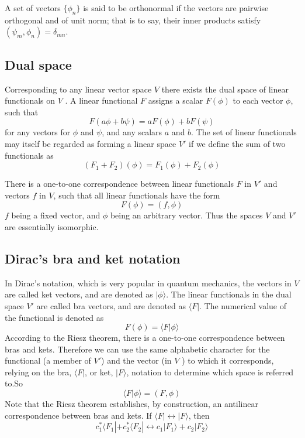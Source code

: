 \begin{newdef}[Orthonormal]
A set of vectors $\{\phi_n\}$ is said to be orthonormal if the vectors are pairwise orthogonal and of unit norm; that is to say, their inner products satisfy $(\psi_m,\phi_n) = \delta_{mn}$.
\end{newdef}

\subsection{Dual space}
\begin{newdef}
Corresponding to any linear vector space $V$ there exists the dual space of linear functionals on $V$ . A linear functional $F$ assigns a scalar $F(\phi)$ to each vector $\phi$, such that
\[F(a\phi+b\psi) = aF(\phi) + bF(\psi)\]
for any vectors for $\phi$ and $\psi$, and any scalars $a$ and $b$. The set of linear functionals may itself be regarded as forming a linear space $V'$ if we define the sum of two functionals as
\[(F_1+F_2)(\phi) = F_1(\phi) + F_2(\phi)\]
\end{newdef}

\begin{newthem} 
There is a one-to-one correspondence between linear functionals $F$ in $V'$ and vectors $f$ in $V$, such that all linear functionals have the form
\[F(\phi) = (f,\phi)\]
$f$ being a fixed vector, and $\phi$ being an arbitrary vector. Thus the spaces $V$ and $V'$ are essentially isomorphic.
\end{newthem}

\subsection{Dirac's bra and ket notation}
\noindent
In Dirac’s notation, which is very popular in quantum mechanics, the vectors in $V$ are called ket vectors, and are denoted as $|\phi \rangle$. The linear functionals in the dual space $V'$ are called bra vectors, and are denoted as $\langle F |$. The numerical value of the functional is denoted as
\[F(\phi) = \langle F | \phi \rangle\]
According to the Riesz theorem, there is a one-to-one correspondence between bras and kets. Therefore we can use the same alphabetic character for the functional (a member of $V'$) and the vector (in $V$ ) to which it corresponds, relying on the bra, $\langle F |$, or ket, $|F\rangle$, notation to determine which space is referred to.So
\[\langle F | \phi \rangle = (F,\phi)\]
Note that the Riesz theorem establishes, by construction, an antilinear correspondence between bras and kets. If $\langle F | \leftrightarrow  |F\rangle$, then
\[c_1^* \langle F_1 | + c_2^* \langle F_2 | \leftrightarrow  c_1 |F_1\rangle + c_2|F_2\rangle\]

